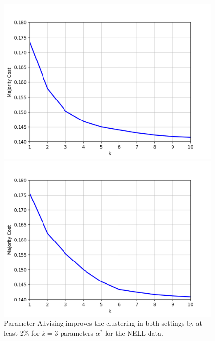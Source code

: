 \begin{figure}[h]
\centering
\begin{minipage}{.45\textwidth}
  \centering
  \includegraphics[width=\linewidth]{plots/nell_sc_1000_top10}
\end{minipage}
\begin{minipage}{.45\textwidth}
  \centering
  \includegraphics[width=\linewidth]{plots/nell_ac_1000_top10}
\end{minipage}
\caption{Parameter Advising improves the clustering in both settings by at least $2\%$ for $k = 3$ parameters $\alpha^*$ for the NELL data.} 
\label{fig:nell1000top10}
\end{figure}

